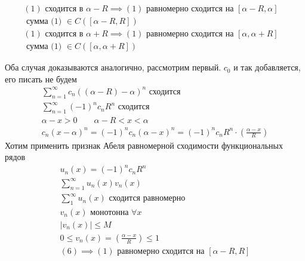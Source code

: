 \documentclass[main]{subfiles}
\begin{document}
\begin{theorem}[Абеля]
    \begin{gather*}
        (1) \text{ сходится в } \alpha - R \implies (1) \text{ равномерно сходится на } [\alpha - R,\alpha]  \quad \\
        \text{ сумма (1) } \in C([\alpha - R,R]) \\
        (1) \text{ сходится в } \alpha + R \implies (1) \text{ равномерно сходится на } [\alpha,\alpha+R]  \quad \\
        \text{ сумма (1) } \in C([\alpha , \alpha +R])
    \end{gather*}
\end{theorem}

\begin{longProof}
    Оба случая доказываются аналогично, рассмотрим первый. $c_0$ и так добавляется, его писать не будем
    \begin{gather*}
        \sum^\infty_{n=1} c_n((\alpha-R)-\alpha)^n \text{ сходится } \\
        \sum^\infty_{n=1} (-1)^n c_n R^n \text{ сходится } \tag{5} \\
        \alpha - x > 0 \quad \quad \alpha - R < x < \alpha \\
        c_n(x-\alpha)^n = (-1)^n c_n (\alpha - x)^n = (-1)^n c_n R^n \cdot \left ( \frac{\alpha-x}{R} \right ) \tag{6}
    \end{gather*}
    Хотим применить признак Абеля равномерной сходимости функциональных рядов \\
    \begin{gather*}
        u_n(x) = (-1)^n c_n R^n \\
        \sum^\infty_{n=1} u_n(x) v_n(x) \\
        \sum^\infty_1 u_n(x) \text{ сходится равномерно } \\
         v_n(x) \text{ монотонна } \forall x \\
         |v_n(x)| \leq M \\
         0 \leq v_n(x) = \left ( \frac{\alpha-x}{R} \right ) \leq 1 \\
         (6) \implies (1) \text{ равномерно сходится на } [\alpha - R, R] 
    \end{gather*}
\end{longProof}
\end{document}

